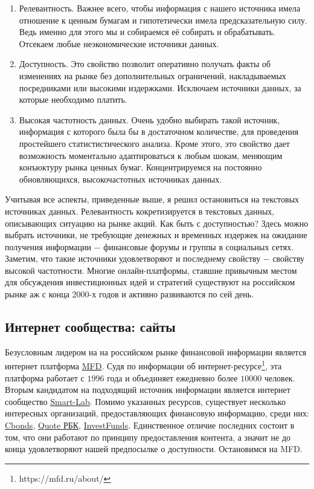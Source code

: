 \documentclass{article}
\begin{document}
\begin{enumerate}
	\item Релевантность. Важнее всего, чтобы информация с нашего источника имела отношение к ценным бумагам и гипотетически имела предсказательную силу. Ведь именно для этого мы и собираемся её собирать и обрабатывать. Отсекаем любые неэкономические источники данных.
	\item Доступность. Это свойство позволит оперативно получать факты об изменениях на рынке без дополнительных ограничений, накладываемых посредниками или высокими издержками.  Исключаем источники данных, за которые необходимо платить. 
	\item Высокая частотность данных. Очень удобно выбирать такой источник, информация с которого была бы в достаточном количестве, для проведения простейшего статистистического анализа. Кроме этого, это свойство дает возможность моментально адаптироваться к любым шокам, меняющим конъюктуру рынка ценных бумаг. Концентрируемся на постоянно обновляющихся, высокочастотных источниках данных.
\end{enumerate}
Учитывая все аспекты, приведенные выше, я решил остановиться на текстовых источниках данных. Релевантность кокретизируется в текстовых данных, описывающих ситуацию на рынке акций. Как быть с доступностью? Здесь можно выбрать источники, не требующие денежных и временных издержек на ожидание получения информации $-$ финансовые форумы и группы в социальных сетях. Заметим, что такие источники удовлетворяют и последнему свойству $-$ свойству высокой частотности. Многие онлайн-платформы, ставшие привычным местом для обсуждения инвестиционных идей и стратегий существуют на российском рынке аж с конца 2000-х годов и активно развиваются по сей день.

\subsection{Интернет сообщества: сайты}

Безусловным лидером на на российском рынке финансовой информации является интернет платформа \href{www.mfd.ru}{MFD}. Судя по информации об интернет-ресурсе\footnote{https://mfd.ru/about/}, эта платформа работает с $1996$ года и объединяет ежедневно более $10000$ человек.
Вторым кандидатом на подходящий источник информации является интернет сообщество \href{https://smart-lab.ru}{Smart-Lab}. Помимо указанных ресурсов, существует несколько интересных организаций, предоставляющих финансовую информацию, среди них: \href{http://cbonds.ru}{Cbonds}, \href{https://quote.rbc.ru}{Quote РБК}, \href{https://investfunds.ru}{InvestFunds}. 
Единственное отличие последних состоит в том, что они работают по принципу предоставления контента, а значит не до конца удовлетворяют нашей предпосылке о доступности. Остановимся на MFD.
\end{document}
